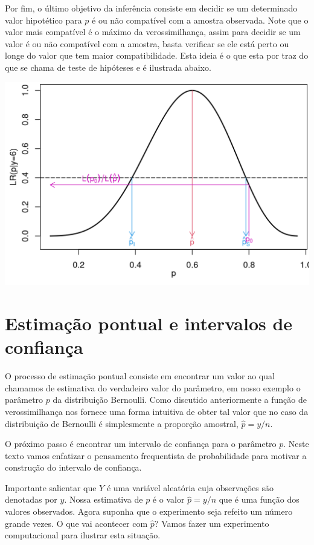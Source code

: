 \documentclass[
  10pt,
  a4paper]{book}
\begin{document}
Por fim, o último objetivo da inferência consiste em decidir se um determinado valor hipotético para \(p\) é ou não compatível com a amostra observada. Note que o valor mais compatível é o máximo da verossimilhança, assim para decidir se um valor é ou não compatível com a amostra, basta verificar se ele está perto ou longe do valor que tem maior compatibilidade. Esta ideia é o que esta por traz do que se chama de teste de hipóteses e é ilustrada abaixo.

\begin{center}\includegraphics{figures/unnamed-chunk-380-1} \end{center}

\hypertarget{estimauxe7uxe3o-pontual-e-intervalos-de-confianuxe7a}{%
\section{Estimação pontual e intervalos de confiança}\label{estimauxe7uxe3o-pontual-e-intervalos-de-confianuxe7a}}

O processo de estimação pontual consiste em encontrar um valor ao qual chamamos de estimativa do verdadeiro valor do parâmetro, em nosso exemplo o parâmetro \(p\) da distribuição Bernoulli. Como discutido anteriormente a função de verossimilhança nos fornece uma forma intuitiva de obter tal valor que no caso da distribuição de Bernoulli é simplesmente a proporção amostral, \(\hat{p} = y/n\).

O próximo passo é encontrar um intervalo de confiança para o parâmetro \(p\). Neste texto vamos enfatizar o pensamento frequentista de probabilidade para motivar a construção do intervalo de confiança.

Importante salientar que \(Y\) é uma variável aleatória cuja observações são denotadas por \(y\). Nossa estimativa de \(p\) é o valor \(\hat{p} = y/n\) que é uma função dos valores observados. Agora suponha que o experimento seja refeito um número grande vezes. O que vai acontecer com \(\hat{p}\)? Vamos fazer um experimento computacional para ilustrar esta situação.
\end{document}
